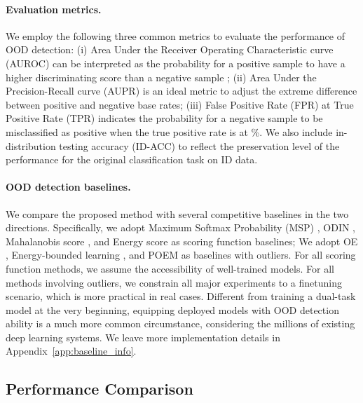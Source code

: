 \documentclass{article}
\theoremstyle{plain}
\theoremstyle{definition}
\theoremstyle{remark}
\begin{document}
\paragraph{Evaluation metrics.} We employ the following three common metrics to evaluate the performance of OOD detection: (i) Area Under the Receiver Operating Characteristic curve (AUROC) \citep{inproceedings} can be interpreted as the probability for a positive sample to have a higher discriminating score than a negative sample \citep{fawcett2006introduction}; (ii) Area Under the Precision-Recall curve (AUPR) \citep{manning99foundations} is an ideal metric to adjust the extreme difference between positive and negative base rates; (iii) False Positive Rate (FPR) at  True Positive Rate (TPR) \citep{LiangLS18} indicates the probability for a negative sample to be misclassified as positive when the true positive rate is at \%. We also include in-distribution testing accuracy (ID-ACC) to reflect the preservation level of the performance for the original classification task on ID data.

\paragraph{OOD detection baselines.} We compare the proposed method with several competitive baselines in the two directions. Specifically, we adopt Maximum Softmax Probability (MSP) \citep{hendrycks17baseline}, ODIN \citep{LiangLS18}, Mahalanobis score \citep{10.5555/3327757.3327819}, and Energy score \citep{liu2020energy} as scoring function baselines; We adopt OE \citep{hendrycks2018deep}, Energy-bounded learning \citep{liu2020energy}, and POEM \citep{ming2022poem} as baselines with outliers. For all scoring function methods, we assume the accessibility of well-trained models. For all methods involving outliers, we constrain all major experiments to a finetuning scenario, which is more practical in real cases. Different from training a dual-task model at the very beginning, equipping deployed models with OOD detection ability is a much more common circumstance, considering the millions of existing deep learning systems. We leave more implementation details in Appendix~\ref{app:baseline_info}.



\subsection{Performance Comparison}
\label{sec:exp_part2}
\end{document}
